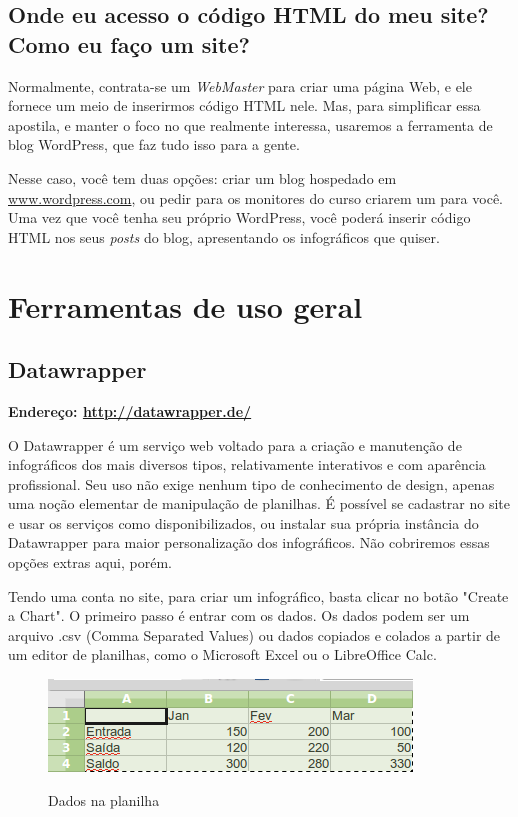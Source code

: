 \documentclass[12pt,onecolumn]{article}
\begin{document}
  \subsection{Onde eu acesso o código HTML do meu site? Como eu faço um site?}
    Normalmente, contrata-se um \textit{WebMaster} para criar uma página Web, e
    ele fornece um meio de inserirmos código HTML nele. Mas, para simplificar
    essa apostila, e manter o foco no que realmente interessa, usaremos a
    ferramenta de blog WordPress, que faz tudo isso para a gente.
    
    Nesse caso, você tem duas opções: criar um blog hospedado em
    \url{www.wordpress.com}, ou pedir para os monitores do curso criarem um
    para você\footnotemark. Uma vez que você tenha seu próprio WordPress, você
    poderá inserir código HTML nos seus \textit{posts} do blog, apresentando os
    infográficos que quiser.
    

\clearpage
\section{Ferramentas de uso geral}
  \subsection{Datawrapper}
     \textbf{Endereço: \url{http://datawrapper.de/}}
    
    O Datawrapper é um serviço web voltado para a criação e manutenção de
    infográficos dos mais diversos tipos, relativamente interativos e com
    aparência profissional. Seu uso não exige nenhum tipo de conhecimento de
    design, apenas uma noção elementar de manipulação de planilhas. É possível
    se cadastrar no site e usar os serviços como disponibilizados, ou instalar
    sua própria instância do Datawrapper para maior personalização dos
    infográficos. Não cobriremos essas opções extras aqui, porém.
    
    Tendo uma conta no site, para criar um infográfico, basta clicar no botão 
    "Create a Chart". O primeiro passo é entrar com os dados. Os dados podem ser 
    um arquivo .csv (Comma Separated Values) ou dados copiados e colados a partir
    de um editor de planilhas, como o Microsoft Excel ou o LibreOffice Calc.
    
    \begin{figure}[H]
      \begin{center}
        \includegraphics[scale=0.5]{dados-calc.png}
        \label{fig:dados-calc}
        \caption{Dados na planilha}
      \end{center}
    \end{figure}
    
\end{document}
